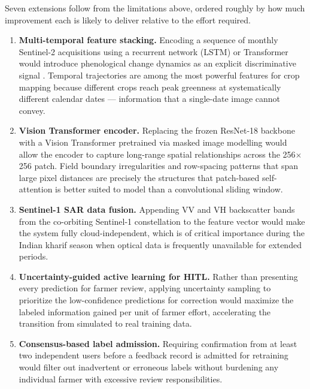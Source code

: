 \documentclass[12pt,a4paper,oneside]{report}
\begin{document}
Seven extensions follow from the limitations above, ordered roughly by how much improvement each is likely to deliver relative to the effort required.

\begin{enumerate}

  \item \textbf{Multi-temporal feature stacking.}
        Encoding a sequence of monthly Sentinel-2 acquisitions using a recurrent
        network (LSTM) or Transformer would introduce phenological change dynamics
        as an explicit discriminative signal \cite{zhong2019deep}. Temporal
        trajectories are among the most powerful features for crop mapping because
        different crops reach peak greenness at systematically different calendar
        dates — information that a single-date image cannot convey.

  \item \textbf{Vision Transformer encoder.}
        Replacing the frozen ResNet-18 backbone with a Vision Transformer pretrained
        via masked image modelling \cite{dosovitskiy2020vit} would allow the encoder
        to capture long-range spatial relationships across the 256$\times$256 patch.
        Field boundary irregularities and row-spacing patterns that span large
        pixel distances are precisely the structures that patch-based self-attention
        is better suited to model than a convolutional sliding window.

  \item \textbf{Sentinel-1 SAR data fusion.}
        Appending VV and VH backscatter bands from the co-orbiting Sentinel-1
        constellation to the feature vector would make the system fully
        cloud-independent, which is of critical importance during the Indian kharif
        season when optical data is frequently unavailable for extended periods.

  \item \textbf{Uncertainty-guided active learning for HITL.}
        Rather than presenting every prediction for farmer review, applying
        uncertainty sampling \cite{settles2009active} to prioritize the
        low-confidence predictions for correction would maximize the labeled
        information gained per unit of farmer effort, accelerating the transition
        from simulated to real training data.

  \item \textbf{Consensus-based label admission.}
        Requiring confirmation from at least two independent users before a feedback
        record is admitted for retraining would filter out inadvertent or erroneous
        labels without burdening any individual farmer with excessive review
        responsibilities.


\end{enumerate}
\end{document}
